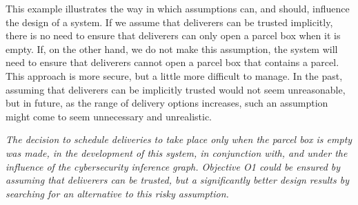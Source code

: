 This example illustrates the way in which assumptions can, and should, influence the design of a system. If we assume that deliverers can be trusted implicitly, there is no need to ensure that deliverers can only open a parcel box when it is empty. If, on the other hand, we do not make this assumption, the system will need to ensure that deliverers cannot open a parcel box that contains a parcel. This approach is more secure, but a little more difficult to manage. In the past, assuming that deliverers can be implicitly trusted would not seem unreasonable, but in future, as the range of delivery options increases, such an assumption might come to seem unnecessary and unrealistic.

{\em The decision to schedule deliveries to take place only when the parcel box is empty
was made, in the development of this system, in conjunction with, and under the influence
of the cybersecurity inference graph. Objective O1 could be ensured by {\em assuming that
deliverers can be trusted}, but a significantly better design results by searching for 
an alternative to this risky assumption.}

